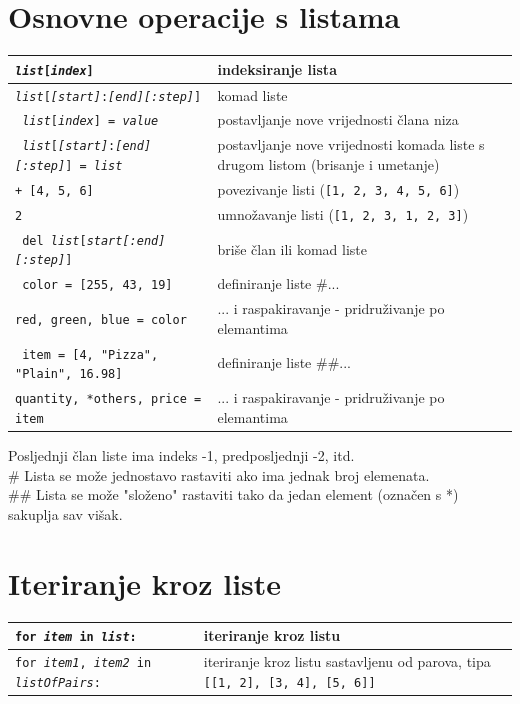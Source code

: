 \documentclass[10pt]{article}
\begin{document}
    \section*{\color{NavyBlue} Osnovne operacije s listama}
    \begin{tabular}{|>{\tt}p{9.00cm}|>{}p{15.50cm}|}
        \hline
        \textit{list}[\textit{index}] & indeksiranje lista 
        \\ \hline
        \textit{list}[\textit{[start]}:\textit{[end]}\textit{[:step]}] & komad liste 
        \\ \hline
        \textit{list}[\textit{index}] = \textit{value} & postavljanje nove vrijednosti člana niza
        \\ \hline
        \textit{list}[\textit{[start]}:\textit{[end]}\textit{[:step]}] = \textit{list} & postavljanje nove vrijednosti komada liste s drugom listom (brisanje i umetanje)
        \\ \hline
        [1, 2, 3] + [4, 5, 6] & povezivanje listi (\texttt{[1, 2, 3, 4, 5, 6]})
        \\ \hline
        [1, 2, 3] * 2 & umnožavanje listi (\texttt{[1, 2, 3, 1, 2, 3]})
        \\ \hline
        del \textit{list}[\textit{start}\textit{[:end]}\textit{[:step]}] & briše član ili komad liste
        \\ \hline
        color = [255, 43, 19] & definiranje liste \#...
        \\
        red, green, blue = color & ... i raspakiravanje - pridruživanje po elemantima
        \\ \hline
        item = [4, "Pizza", "Plain", 16.98] & definiranje liste \#\#...
        \\
        quantity, *others, price = item & ... i raspakiravanje - pridruživanje po elemantima
        \\ \hline
    \end{tabular}
    \begin{center}
        \footnotesize
        Posljednji član liste ima indeks -1, predposljednji -2, itd. \\
        \# Lista se može jednostavo rastaviti ako ima jednak broj elemenata. \\
        \#\# Lista se može "složeno" rastaviti tako da jedan element (označen s *) sakuplja sav višak.
    \end{center}

    \section*{\color{NavyBlue} Iteriranje kroz liste}
    \begin{tabular}{|>{\tt}p{9.00cm}|>{}p{15.50cm}|}
        \hline
        for \textit{item} in \textit{list}: & iteriranje kroz listu
        \\ \hline
        for \textit{item1}, \textit{item2} in \textit{listOfPairs}: & iteriranje kroz listu sastavljenu od parova, tipa \texttt{[[1, 2], [3, 4], [5, 6]]}
        \\ \hline
    \end{tabular}
\end{document}
